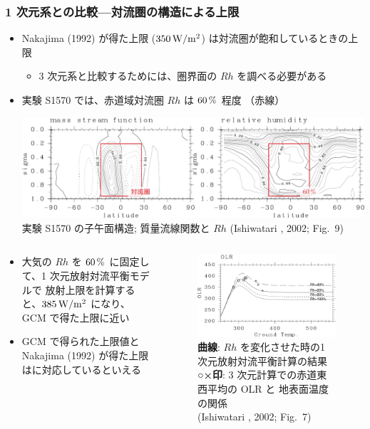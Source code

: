 \documentclass[aspectratio=149,9pt,fleqn]{beamer}
\newcommand{\hmemph}[1]{\textbf{#1}}
\begin{document}
\begin{frame}
	\frametitle{1 次元系との比較---対流圏の構造による上限}
	\begin{itemize}
		\item Nakajima \etal (1992) が得た上限 (\(350\hmu{W/m^2}\)) は対流圏が飽和しているときの上限
			\begin{itemize}
				\item 3 次元系と比較するためには、圏界面の \(\mathit{Rh}\) を調べる必要がある
			\end{itemize}
		\item 実験 S1570 では、赤道域対流圏 \(\mathit{Rh}\) は \(60\hmu{\%}\) 程度
			\textcolor[cmyk]{0,1,1,0}{（赤線）}
			\begin{center}
				\scriptsize
				\includegraphics[width=.7\textwidth]{zu-aka.pdf}\\
				実験 S1570 の子午面構造;
				質量流線関数と \(\mathit{Rh}\)  (Ishiwatari \etal*, 2002; Fig.\ 9)
			\end{center}
	\end{itemize}
	\begin{columns}[T,onlytextwidth]
		\begin{column}{.48\textwidth}
			\begin{itemize}
				\item 大気の \(\mathit{Rh}\) を \(60\hmu{\%}\) に固定して、1 次元放射対流平衡モデルで
					放射上限を計算すると、\(385\hmu{W/m^2}\) になり、GCM で得た上限に近い
				\item GCM で得られた上限値と
					Nakajima \etal (1992) が得た上限はに対応しているといえる
			\end{itemize}
		\end{column}
		\begin{column}{.5\textwidth}
			\begin{figure}
				\scriptsize
				\includegraphics[width=.7\textwidth]{./fig/Tg-OLR-1dimL99-3dEq-crop.pdf}\\
				\hmemph{曲線}: \(\mathit{Rh}\) を変化させた時の1 次元放射対流平衡計算の結果\\
				\hmemph{○×印}: 3 次元計算での赤道東西平均の OLR と 地表面温度の関係\\
				(Ishiwatari \etal*, 2002; Fig.~7)
			\end{figure}
		\end{column}
	\end{columns}
\end{frame}
\end{document}
